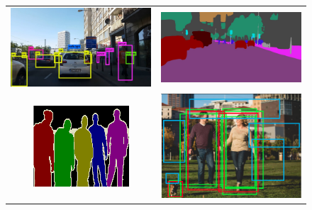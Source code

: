 \begin{figure}
\begin{tabular}{cc}
    \includegraphics[scale=0.11]{./tex/computer-vision/object-recognition/recodetec.jpg}&\includegraphics[scale=0.1]{./tex/computer-vision/object-recognition/segsem.jpg}\\
    \includegraphics[scale=0.8]{./tex/computer-vision/object-recognition/instanceseg.png}&\includegraphics[scale=0.25]{./tex/computer-vision/object-recognition/objprop.png}\\

\end{tabular}
\end{figure}
